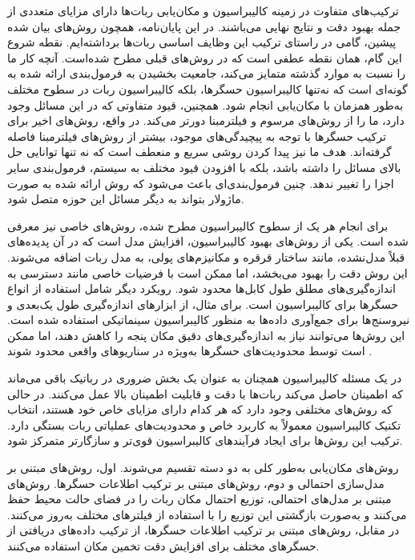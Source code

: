 ترکیب‌های متفاوت در زمینه کالیبراسیون و مکان‌یابی ربات‌ها دارای مزایای متعددی از جمله بهبود دقت و نتایج نهایی می‌باشند. در این پایان‌نامه، همچون روش‌های بیان شده پیشین، گامی در راستای ترکیب این وظایف اساسی ربات‌ها برداشته‌ایم. نقطه شروع این گام، همان نقطه عطفی است که در روش‌های قبلی مطرح شده‌است. آنچه کار ما را نسبت به موارد گذشته متمایز می‌کند، جامعیت بخشیدن به فرمول‌بندی ارائه شده به گونه‌ای است که نه‌تنها کالیبراسیون حسگرها، بلکه کالیبراسیون ربات در سطوح مختلف به‌طور همزمان با مکان‌یابی انجام شود. همچنین، قیود متفاوتی که در این مسائل وجود دارد، ما را از روش‌های مرسوم و فیلترمبنا دورتر می‌کند. در واقع، روش‌های اخیر برای ترکیب حسگرها با توجه به پیچیدگی‌های موجود، بیشتر از روش‌های فیلترمبنا فاصله گرفته‌اند. هدف ما نیز پیدا کردن روشی سریع و منعطف است که نه تنها توانایی حل بالای مسائل را داشته باشد، بلکه با افزودن قیود مختلف به سیستم، فرمول‌بندی سایر اجزا را تغییر ندهد. چنین فرمول‌بندی‌ای باعث می‌شود که روش ارائه شده به صورت ماژولار بتواند به دیگر مسائل این حوزه متصل شود. 

برای انجام هر یک از سطوح کالیبراسیون مطرح شده، روش‌های خاصی نیز معرفی شده است. یکی از روش‌های بهبود کالیبراسیون، افزایش مدل است که در آن پدیده‌های قبلاً مدل‌نشده، مانند ساختار قرقره و مکانیزم‌های پولی، به مدل ربات اضافه می‌شوند. این روش دقت را بهبود می‌بخشد، اما ممکن است با فرضیات خاصی مانند دسترسی به اندازه‌گیری‌های مطلق طول کابل‌ها محدود شود. رویکرد دیگر شامل استفاده از انواع حسگرها برای کالیبراسیون است. برای مثال، از ابزارهای اندازه‌گیری طول یک‌بعدی و نیرو‌سنج‌ها برای جمع‌آوری داده‌ها به منظور کالیبراسیون سینماتیکی استفاده شده است. این روش‌ها می‌توانند نیاز به اندازه‌گیری‌های دقیق مکان پنجه را کاهش دهند، اما ممکن است توسط محدودیت‌های حسگرها به‌ویژه در سناریوهای واقعی محدود شوند
\cite{elatta2004overview, roth1987overview}. 

در یک مسئله کالیبراسیون همچنان به عنوان یک بخش ضروری در رباتیک باقی می‌ماند که اطمینان حاصل می‌کند ربات‌ها با دقت و قابلیت اطمینان بالا عمل می‌کنند. در حالی که روش‌های مختلفی وجود دارد که هر کدام دارای مزایای خاص خود هستند، انتخاب تکنیک کالیبراسیون معمولاً به کاربرد خاص و محدودیت‌های عملیاتی ربات بستگی دارد. ترکیب این روش‌ها برای ایجاد فرآیندهای کالیبراسیون قوی‌تر و سازگارتر متمرکز شود.

روش‌های مکان‌یابی به‌طور کلی به دو دسته تقسیم می‌شوند. اول، روش‌های مبتنی بر مدل‌سازی احتمالی و دوم، روش‌های مبتنی بر ترکیب اطلاعات حسگرها. روش‌های مبتنی بر مدل‌های احتمالی، توزیع احتمال مکان ربات را در فضای حالت محیط حفظ می‌کنند و به‌صورت بازگشتی این توزیع را با استفاده از فیلترهای مختلف به‌روز می‌کنند. در مقابل، روش‌های مبتنی بر ترکیب اطلاعات حسگرها، از ترکیب داده‌های دریافتی از حسگرهای مختلف برای افزایش دقت تخمین مکان استفاده می‌کنند.

